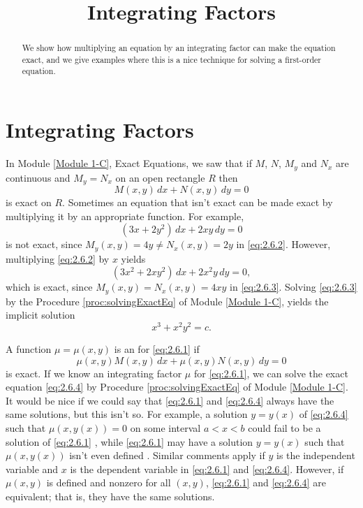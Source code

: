 \documentclass{ximera}
\title{Integrating Factors}
\begin{document}
\begin{abstract}
We show how multiplying an equation by an integrating factor can make the equation exact, and we give examples where this is a nice technique for solving a first-order equation.
\end{abstract}

\maketitle



\section*{Integrating Factors}
In Module \ref{Module 1-C}, Exact Equations, we saw that if $M$, $N$, $M_y$ and $N_x$ are
continuous and $M_y=N_x$ on an open rectangle $R$ then
\begin{equation} \label{eq:2.6.1}
M(x,y)\,dx+N(x,y)\,dy=0
\end{equation}
is exact on $R$. Sometimes an equation that isn't  exact can be made
exact by multiplying it by an appropriate function. For example,
\begin{equation}\label{eq:2.6.2}
(3x+2y^2)\,dx+2xy\,dy=0
\end{equation}
is  not exact, since
$M_y(x,y)=4y\neq  N_x(x,y)=2y$ in \eqref{eq:2.6.2}.
 However, multiplying \eqref{eq:2.6.2}  by $x$ yields
\begin{equation}\label{eq:2.6.3}
(3x^2+2xy^2)\,dx+2x^2y\,dy=0,
\end{equation}
which is exact, since
$M_y(x,y)=N_x(x,y)=4xy$ in \eqref{eq:2.6.3}.
Solving \eqref{eq:2.6.3} by the Procedure \ref{proc:solvingExactEq} of Module \ref{Module 1-C},
 yields the implicit solution
$$
x^3+x^2y^2=c.
$$

A function $\mu=\mu(x,y)$ is  an  for
\eqref{eq:2.6.1}  if
\begin{equation}\label{eq:2.6.4}
 \mu(x,y)M (x,y)\,dx+\mu(x,y)N (x,y)\,dy=0
 \end{equation}
 is exact. If we know an integrating
factor $\mu$ for \eqref{eq:2.6.1}, we can solve the exact equation
\eqref{eq:2.6.4} by Procedure \ref{proc:solvingExactEq} of Module \ref{Module 1-C}. It would be
nice
if we could say that \eqref{eq:2.6.1} and \eqref{eq:2.6.4} always have the
same solutions, but this isn't so. For example, a solution
$y=y(x)$ of \eqref{eq:2.6.4} such that $\mu(x,y(x))=0$ on some interval
$a<x<b$ could fail to be a solution of \eqref{eq:2.6.1}
, while
\eqref{eq:2.6.1} may have a solution $y=y(x)$ such that $\mu(x,y(x)) $
isn't even defined 
. Similar comments
apply if $y$ is the independent variable and $x$ is the dependent
variable  in \eqref{eq:2.6.1} and \eqref{eq:2.6.4}.  However, if $\mu(x,y)$
is defined and nonzero for all $(x,y)$,  \eqref{eq:2.6.1}  and
\eqref{eq:2.6.4} are equivalent; that is, they have the same solutions.
\end{document}
